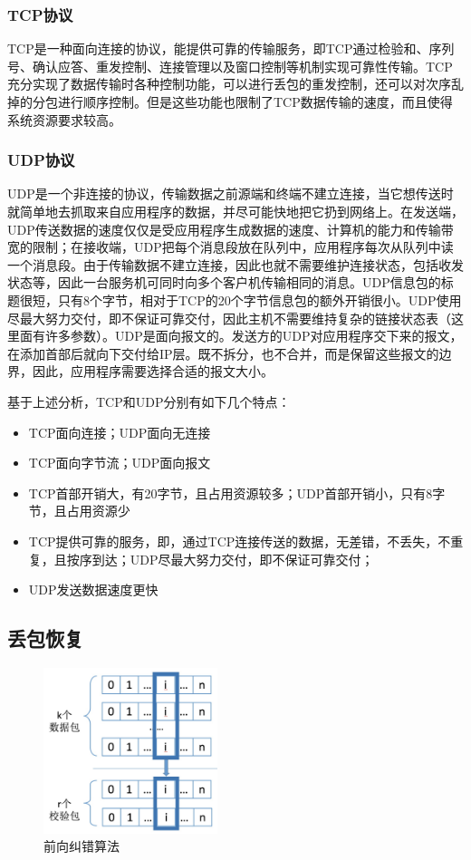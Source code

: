 \documentclass[onecolumn]{article}
\begin{document}
\begin{CJK*}{UTF8}{gbsn}
\subsubsection{TCP协议}
TCP是一种面向连接的协议，能提供可靠的传输服务，即TCP通过检验和、序列号、确认应答、重发控制、连接管理以及窗口控制等机制实现可靠性传输。TCP充分实现了数据传输时各种控制功能，可以进行丢包的重发控制，还可以对次序乱掉的分包进行顺序控制。但是这些功能也限制了TCP数据传输的速度，而且使得系统资源要求较高。
\subsubsection{UDP协议}

UDP是一个非连接的协议，传输数据之前源端和终端不建立连接，当它想传送时就简单地去抓取来自应用程序的数据，并尽可能快地把它扔到网络上。在发送端，UDP传送数据的速度仅仅是受应用程序生成数据的速度、计算机的能力和传输带宽的限制；在接收端，UDP把每个消息段放在队列中，应用程序每次从队列中读一个消息段。由于传输数据不建立连接，因此也就不需要维护连接状态，包括收发状态等，因此一台服务机可同时向多个客户机传输相同的消息。UDP信息包的标题很短，只有8个字节，相对于TCP的20个字节信息包的额外开销很小。UDP使用尽最大努力交付，即不保证可靠交付，因此主机不需要维持复杂的链接状态表（这里面有许多参数）。UDP是面向报文的。发送方的UDP对应用程序交下来的报文，在添加首部后就向下交付给IP层。既不拆分，也不合并，而是保留这些报文的边界，因此，应用程序需要选择合适的报文大小。

基于上述分析，TCP和UDP分别有如下几个特点：
\begin{itemize}
\item TCP面向连接；UDP面向无连接
\item TCP面向字节流；UDP面向报文
\item TCP首部开销大，有20字节，且占用资源较多；UDP首部开销小，只有8字节，且占用资源少
\item TCP提供可靠的服务，即，通过TCP连接传送的数据，无差错，不丢失，不重复，且按序到达；UDP尽最大努力交付，即不保证可靠交付；
\item UDP发送数据速度更快
\end{itemize}

\subsection{丢包恢复}
\begin{figure}[h]
	\centering
	\includegraphics[width=2in]{FEC.jpg}
	\caption{前向纠错算法}
	\label{fig:FEC}
\end{figure}


\end{CJK*}
\end{document}
